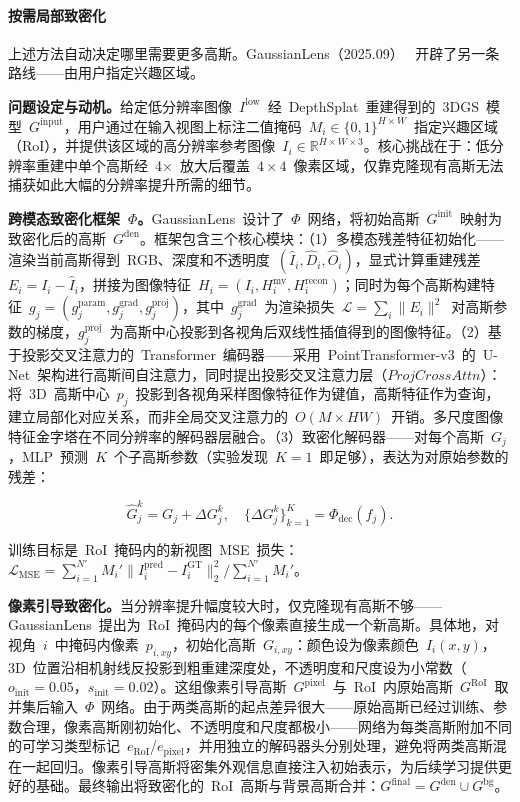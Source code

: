 \paragraph{按需局部致密化}

上述方法自动决定哪里需要更多高斯。GaussianLens（2025.09）~\cite{2509_25603} 开辟了另一条路线——由用户指定兴趣区域。

\textbf{问题设定与动机。}给定低分辨率图像~$I^{\text{low}}$~经~DepthSplat~重建得到的~3DGS~模型~$G^{\text{input}}$，用户通过在输入视图上标注二值掩码~$M_i \in \{0,1\}^{H \times W}$~指定兴趣区域（RoI），并提供该区域的高分辨率参考图像~$I_i \in \mathbb{R}^{H \times W \times 3}$。核心挑战在于：低分辨率重建中单个高斯经~4$\times$~放大后覆盖~$4 \times 4$~像素区域，仅靠克隆现有高斯无法捕获如此大幅的分辨率提升所需的细节。

\textbf{跨模态致密化框架~$\Phi$。}GaussianLens~设计了~$\Phi$~网络，将初始高斯~$G^{\text{init}}$~映射为致密化后的高斯~$G^{\text{den}}$。框架包含三个核心模块：（1）多模态残差特征初始化——渲染当前高斯得到~RGB、深度和不透明度~$(\hat{I}_i, \hat{D}_i, \hat{O}_i)$，显式计算重建残差~$E_i = I_i - \hat{I}_i$，拼接为图像特征~$H_i = (I_i, H_i^{\text{mv}}, H_i^{\text{recon}})$；同时为每个高斯构建特征~$g_j = (g_j^{\text{param}}, g_j^{\text{grad}}, g_j^{\text{proj}})$，其中~$g_j^{\text{grad}}$~为渲染损失~$\mathcal{L}=\sum_i\|E_i\|^2$~对高斯参数的梯度，$g_j^{\text{proj}}$~为高斯中心投影到各视角后双线性插值得到的图像特征。（2）基于投影交叉注意力的~Transformer~编码器——采用~PointTransformer-v3~的~U-Net~架构进行高斯间自注意力，同时提出投影交叉注意力层（$ProjCrossAttn$）：将~3D~高斯中心~$p_j$~投影到各视角采样图像特征作为键值，高斯特征作为查询，建立局部化对应关系，而非全局交叉注意力的~$O(M \times HW)$~开销。多尺度图像特征金字塔在不同分辨率的解码器层融合。（3）致密化解码器——对每个高斯~$G_j$，MLP~预测~$K$~个子高斯参数（实验发现~$K=1$~即足够），表达为对原始参数的残差：

\begin{equation*}
\hat{G}_j^k = G_j + \Delta G_j^k, \quad \{\Delta G_j^k\}_{k=1}^K = \Phi_{\text{dec}}(f_j).
\end{equation*}

训练目标是~RoI~掩码内的新视图~MSE~损失：$\mathcal{L}_{\text{MSE}} = \sum_{i=1}^{N'} M_i' \|I_i^{\text{pred}} - I_i^{\text{GT}}\|_2^2 / \sum_{i=1}^{N'} M_i'$。

\textbf{像素引导致密化。}当分辨率提升幅度较大时，仅克隆现有高斯不够——GaussianLens~提出为~RoI~掩码内的每个像素直接生成一个新高斯。具体地，对视角~$i$~中掩码内像素~$p_{i,xy}$，初始化高斯~$G_{i,xy}$：颜色设为像素颜色~$I_i(x,y)$，3D~位置沿相机射线反投影到粗重建深度处，不透明度和尺度设为小常数（$o_{\text{init}}=0.05$，$s_{\text{init}}=0.02$）。这组像素引导高斯~$G^{\text{pixel}}$~与~RoI~内原始高斯~$G^{\text{RoI}}$~取并集后输入~$\Phi$~网络。由于两类高斯的起点差异很大——原始高斯已经过训练、参数合理，像素高斯刚初始化、不透明度和尺度都极小——网络为每类高斯附加不同的可学习类型标记~$e_{\text{RoI}}$/$e_{\text{pixel}}$，并用独立的解码器头分别处理，避免将两类高斯混在一起回归。像素引导高斯将密集外观信息直接注入初始表示，为后续学习提供更好的基础。最终输出将致密化的~RoI~高斯与背景高斯合并：$G^{\text{final}} = G^{\text{den}} \cup G^{\text{bg}}$。

